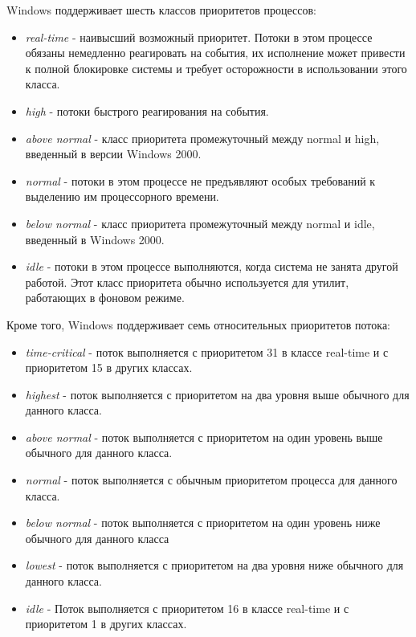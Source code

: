 \documentclass[14pt,a4paper,report]{report}
\begin{document}
Windows поддерживает шесть классов приоритетов процессов:

\begin{itemize}
	\item \emph{real-time} - наивысший возможный приоритет. Потоки в этом процессе обязаны немедленно реагировать на события, их исполнение может привести к полной блокировке системы и требует осторожности в использовании этого класса.
	\item \emph{high} - потоки быстрого реагирования на события. 
	\item \emph{above normal} - класс приоритета промежуточный между normal и high, введенный в версии Windows 2000. 
	\item \emph{normal} - потоки в этом процессе не предъявляют особых требований к выделению им процессорного времени.
	\item \emph{below normal} - класс приоритета промежуточный между normal и idle, введенный в Windows 2000.
	\item \emph{idle} - потоки в этом процессе выполняются, когда система не занята другой работой. Этот класс приоритета обычно используется для утилит, работающих в фоновом режиме. 
\end{itemize}

Кроме того, Windows поддерживает семь относительных приоритетов потока: 

\begin{itemize}
	\item \emph{time-critical} - поток выполняется с приоритетом 31 в классе real-time и с приоритетом 15 в других классах.
	\item \emph{highest} - поток выполняется с приоритетом на два уровня выше обычного для данного класса.
	\item \emph{above normal} - поток выполняется с приоритетом на один уровень выше обычного для данного класса.
	\item \emph{normal} - поток выполняется с обычным приоритетом процесса для данного класса.
	\item \emph{below normal} - поток выполняется с приоритетом на один уровень ниже обычного для данного класса
	\item \emph{lowest} - поток выполняется с приоритетом на два уровня ниже обычного для данного класса.
	\item \emph{idle} - Поток выполняется с приоритетом 16 в классе real-time и с приоритетом 1 в других классах.
\end{itemize}
\end{document}
